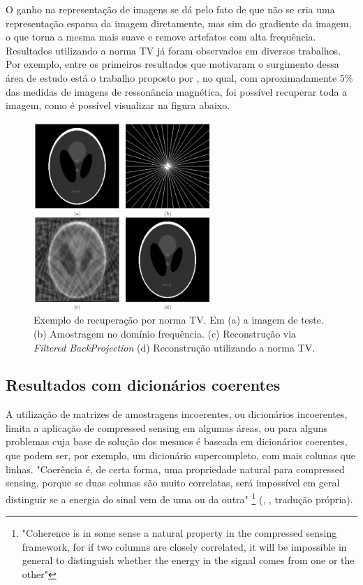 \documentclass[cic,tc]{iiufrgs}
\begin{document}
O ganho na representação de imagens se dá pelo fato de que não se cria uma representação esparsa da imagem
diretamente, mas sim do gradiente da imagem, o que torna a mesma mais suave e remove artefatos com alta
frequência.
Resultados utilizando a norma TV já foram observados em diversos trabalhos.
Por exemplo, entre os primeiros resultados que motivaram o surgimento dessa área de estudo está
o trabalho proposto por \citet{CandesMRI}, no qual, com aproximadamente $5\%$ das medidas de imagens de
ressonância magnética, foi possível recuperar toda a imagem, como é possível visualizar na figura 
abaixo.
\begin{figure}[H]
    \caption{Exemplo de recuperação por norma TV. Em (a) a imagem de teste.
    (b) Amostragem no domínio frequência. (c) Reconstrução via \textit{Filtered BackProjection}
    (d) Reconstrução utilizando a norma TV.}
    \begin{center}
        \includegraphics[width=0.6\textwidth]{img/candesmri}
    \end{center}
    \label{fig:l1ball}
\end{figure}

\subsection{Resultados com dicionários coerentes}
A utilização de matrizes de amostragens incoerentes, ou dicionários incoerentes, limita a aplicação de 
compressed sensing em algumas áreas, ou para alguns problemas cuja base de solução dos mesmos é baseada
em dicionários coerentes, que podem ser, por exemplo, um dicionário supercompleto, com mais colunas que linhas. 
"Coerência é, de certa forma, uma propriedade natural para compressed sensing, 
porque se duas colunas são muito correlatas, será impossível em geral distinguir se a energia do sinal
vem de uma ou da outra" 
\footnote{"Coherence is in some sense a natural property in the compressed sensing framework, for if two
columns are closely correlated, it will be impossible in general to distinguish whether the energy in 
the signal comes from one or the other"}
(\citeauthor{CANDESDICTS}, \citeyear{CANDESDICTS}, tradução própria).
\end{document}
